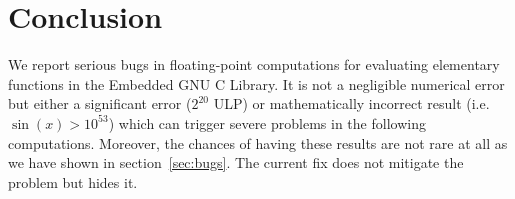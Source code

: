 \documentclass[12pt]{article}
\begin{document}
\section{Conclusion}\label{sec:conclusion}
We report serious bugs in floating-point computations for evaluating
elementary functions in the Embedded GNU C Library. It is not a
negligible numerical error but either a significant error ($2^{20}$
ULP) or mathematically incorrect result (i.e. $\sin(x) > 10^{53}$)
which can trigger severe problems in the following computations.
Moreover, the chances of having these results are not rare at all as
we have shown in section~\ref{sec:bugs}. The current fix does not
mitigate the problem but hides it.



\end{document}
